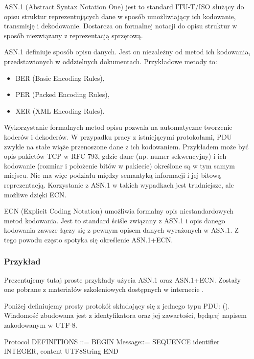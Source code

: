 \documentclass[00-praca-magisterska.tex]{subfiles}
\begin{document}
ASN.1 (Abstract Syntax Notation One) jest to standard ITU-T/ISO służący do opisu
struktur reprezentujących dane w sposób umożliwiający ich kodowanie, transmisję
i dekodowanie. Dostarcza on formalnej notacji do opisu struktur w sposób
niezwiązany z reprezentacją sprzętową.

ASN.1 definiuje sposób opisu danych. Jest on niezależny od metod ich kodowania,
przedstawionych w oddzielnych dokumentach. Przykładowe metody to:
\begin{itemize}
\item BER (Basic Encoding Rules),
\item PER (Packed Encoding Rules),
\item XER (XML Encoding Rules).
\end{itemize}

Wykorzystanie formalnych metod opisu pozwala na automatyczne tworzenie koderów i
dekoderów. W przypadku pracy z istniejącymi protokołami, PDU zwykle na stałe
wiąże przenoszone dane z ich kodowaniem. Przykładem może być opis pakietów TCP w
RFC 793, gdzie dane (np. numer sekwencyjny) i ich kodowanie (rozmiar i
położenie bitów w pakiecie) określone są w tym samym miejscu. Nie ma więc
podziału między semantyką informacji i jej bitową reprezentacją. Korzystanie z
ASN.1 w takich wypadkach jest trudniejsze, ale możliwe dzięki ECN.

ECN (Explicit Coding Notation) umożliwia formalny opis niestandardowych metod
kodowania. Jest to standard ściśle związany z ASN.1 i opis danego kodowania
zawsze łączy się z pewnym opisem danych wyrażonych w ASN.1. Z tego powodu często
spotyka się określenie ASN.1+ECN.

\subsubsection{Przykład}

Prezentujemy tutaj proste przykłady użycia ASN.1 oraz ASN.1+ECN. Zostały one
pobrane z materiałów szkoleniowych dostępnych w internecie \cite{asn1-main,ecn-tutorial1,ecn-tutorial2,ecn-tutorial3}.

Poniżej definiujemy prosty protokół składający się z jednego typu PDU:
(). Wiadomość zbudowana jest z identyfikatora oraz jej
zawartości, będącej napisem zakodowanym w UTF-8.

\begin{textcode}
  Protocol DEFINITIONS ::= BEGIN
       Message::= SEQUENCE {
          identifier INTEGER,
          content    UTF8String
      }
  END
\end{textcode}
\end{document}
